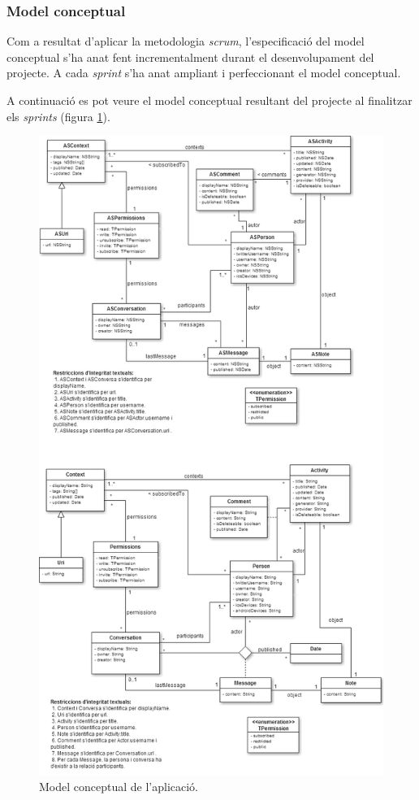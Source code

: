 \subsubsection{Model conceptual}

Com a resultat d'aplicar la metodologia \textit{scrum}, l'especificació del model conceptual s'ha anat fent incrementalment durant el desenvolupament del projecte. A cada \textit{sprint} s'ha anat ampliant i perfeccionant el model conceptual.

A continuació es pot veure el model conceptual resultant del projecte al finalitzar els \textit{sprints} (figura \ref{fig:model_conceptual}).


\begin{figure}[ht]
    \centering
    \includegraphics*[scale=0.60,viewport=0 0 806 750]{Memoria/Especificacio/model_conceptual.png}
    \caption{Model conceptual de l'aplicació.}
    \label{fig:model_conceptual}
\end{figure}
\FloatBarrier 
